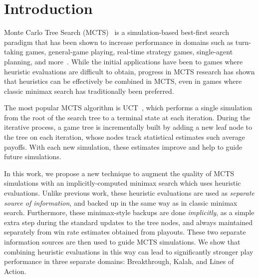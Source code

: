 \documentclass{article}
\begin{document}
\section{Introduction}

Monte Carlo Tree Search (MCTS)~\cite{Coulom06Efficient,Kocsis06Bandit} is a simulation-based best-first
search paradigm that has been shown to increase performance in domains such as turn-taking games, 
general-game playing, real-time strategy games, single-agent planning, and more~\cite{mctssurvey}. 
While the initial applications have been to games where heuristic evaluations are difficult to obtain, 
progress in MCTS research has shown that heuristics can be effectively be combined in MCTS, even in games 
where classic minimax search has traditionally been preferred. 

The most popular MCTS algorithm is UCT~\cite{Kocsis06Bandit}, 
which performs a single simulation from the root of the search tree to a terminal state at each iteration. 
During the iterative process, a game tree is incrementally built by adding a 
new leaf node to the tree on each iteration, whose nodes track statistical estimates such average payoffs. 
With each new simulation, these estimates improve and help to guide future simulations. 


In this work, we propose a new technique to augment the quality of MCTS simulations with  
an implicitly-computed minimax search which uses heuristic evaluations. 
Unlike previous work, these heuristic evaluations are used as {\it separate source of information}, 
and backed up in the same way as in classic minimax search. Furthermore, these minimax-style 
backups are done {\it implicitly},
as a simple extra step during the standard updates to the tree nodes, and always maintained 
separately from win rate estimates obtained from playouts. These two separate information 
sources are then used to guide MCTS simulations. 
We show that combining heuristic evaluations in this way can lead to significantly stronger play performance in three 
separate domains: Breakthrough, Kalah, and Lines of Action. 
\end{document}
